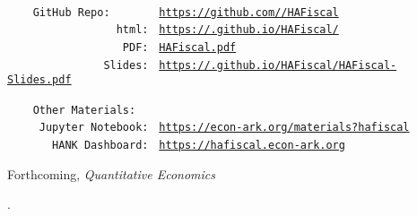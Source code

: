 \documentclass[\PathToRoot/HAFiscal]{subfiles}
\begin{document}
\providecommand{\REMARK}{\href{https://github.com/econ-ark/REMARK}{REMARK}}
\begin{footnotesize}
  \parbox{0.9\textwidth}{
    \begin{tabbing}
      \texttt{~~~~~~~~~~~~~~~~~~~~~~~} \= \=  \\
      \texttt{~~~~GitHub~Repo:~~~~~~~} \> \> \texttt{\href{https://github.com/\owner/HAFiscal}{https://github.com/\owner/HAFiscal}} \\
      \texttt{~~~~~~~~~~~~~~~~~html:~} \> \> \texttt{\href{https://\owner.github.io/HAFiscal/}{https://\owner.github.io/HAFiscal/}} \\
      \texttt{~~~~~~~~~~~~~~~~~~PDF:~} \> \> \texttt{\href{https://github.com/\owner/HAFiscal/blob/master/HAFiscal.pdf}{HAFiscal.pdf}} \\
      \texttt{~~~~~~~~~~~~~~~Slides:~} \> \> \texttt{\href{https://\owner.github.io/HAFiscal/HAFiscal-Slides.pdf}{https://\owner.github.io/HAFiscal/HAFiscal-Slides.pdf}} \\
      \texttt{~~~~~~~~~~~~~~~~~~~~~~~} \> \>  \\
      \texttt{~~~~Other~Materials:~~~} \> \> \\
      \texttt{~~~~~Jupyter~Notebook:~} \> \> \texttt{\href{https://econ-ark.org/materials?hafiscal}{https://econ-ark.org/materials?hafiscal}} \\
      \texttt{~~~~~~~HANK~Dashboard:~} \> \> \texttt{\href{https://hafiscal.econ-ark.org}{https://hafiscal.econ-ark.org}} \\
    \end{tabbing}
  } %
\end{footnotesize}

\centerline{Forthcoming, \textit{Quantitative Economics}}

\begin{authorsinfo}
  \noindent {}. \newline
   \newline
   \newline
   \newline
\end{authorsinfo}
\end{document}
